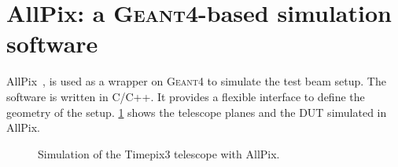 \section{AllPix: a \textsc{Geant4}-based simulation software}
AllPix~\cite{allpix}, is used as a wrapper on \textsc{Geant4} to
simulate the test beam setup. The software is written in C/C++. It
provides a flexible interface to define the geometry of the
setup. \cref{fig:TPX3TelescopeAllpix} shows the telescope planes
and the DUT simulated in AllPix.

\begin{figure}[htbp]
  \centering
  \caption{Simulation of the Timepix3 telescope with AllPix.}
  \label{fig:TPX3TelescopeAllpix}
\end{figure}

